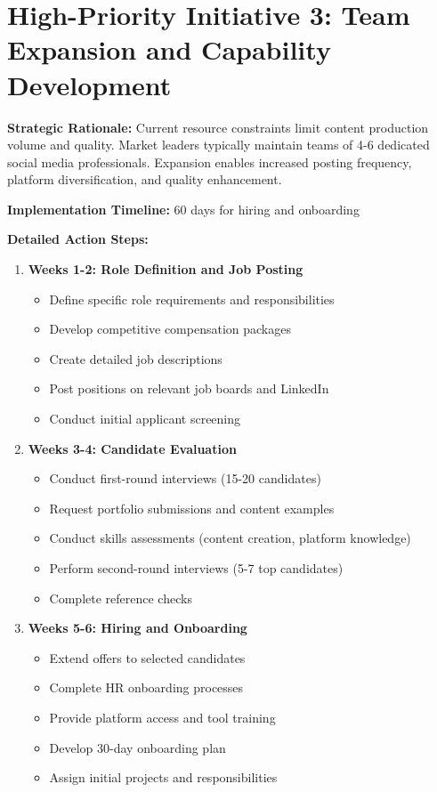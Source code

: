 \documentclass[12pt]{report}
\begin{document}
\section{High-Priority Initiative 3: Team Expansion and Capability Development}

\textbf{Strategic Rationale:} Current resource constraints limit content production volume and quality. Market leaders typically maintain teams of 4-6 dedicated social media professionals. Expansion enables increased posting frequency, platform diversification, and quality enhancement.

\textbf{Implementation Timeline:} 60 days for hiring and onboarding

\textbf{Detailed Action Steps:}

\begin{enumerate}
\item \textbf{Weeks 1-2: Role Definition and Job Posting}
\begin{itemize}
\item Define specific role requirements and responsibilities
\item Develop competitive compensation packages
\item Create detailed job descriptions
\item Post positions on relevant job boards and LinkedIn
\item Conduct initial applicant screening
\end{itemize}

\item \textbf{Weeks 3-4: Candidate Evaluation}
\begin{itemize}
\item Conduct first-round interviews (15-20 candidates)
\item Request portfolio submissions and content examples
\item Conduct skills assessments (content creation, platform knowledge)
\item Perform second-round interviews (5-7 top candidates)
\item Complete reference checks
\end{itemize}

\item \textbf{Weeks 5-6: Hiring and Onboarding}
\begin{itemize}
\item Extend offers to selected candidates
\item Complete HR onboarding processes
\item Provide platform access and tool training
\item Develop 30-day onboarding plan
\item Assign initial projects and responsibilities
\end{itemize}


\end{enumerate}
\end{document}
